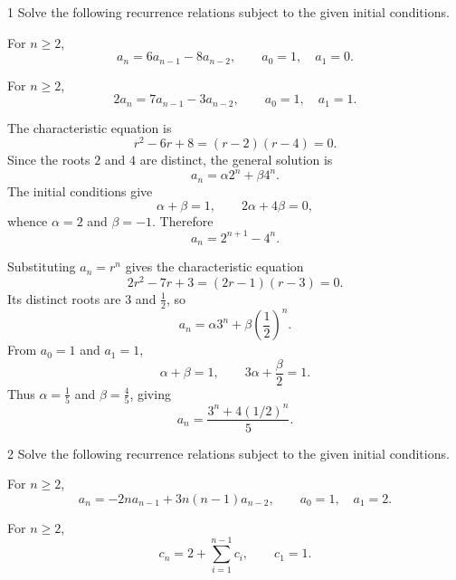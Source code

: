 \documentclass[11pt,oneside]{article}
\begin{document}

\begin{problem}{1}
Solve the following recurrence relations subject to the given initial conditions.
\begin{problemsubparts}
    \item For $n\geq2$,
    \[
        a_n=6a_{n-1}-8a_{n-2},
        \qquad a_0=1,\quad a_1=0.
    \]

    \item For $n\geq2$,
    \[
        2a_n=7a_{n-1}-3a_{n-2},
        \qquad a_0=1,\quad a_1=1.
    \]
\end{problemsubparts}
\end{problem}

\begin{solution}
\begin{problemsubparts}
    \item The characteristic equation is
    \[
        r^2-6r+8=(r-2)(r-4)=0.
    \]
    Since the roots $2$ and $4$ are distinct, the general solution is
    \[
        a_n=\alpha 2^n+\beta 4^n.
    \]
    The initial conditions give
    \[
        \alpha+\beta=1,\qquad 2\alpha+4\beta=0,
    \]
    whence $\alpha=2$ and $\beta=-1$. Therefore
    \[
        a_n=2^{n+1}-4^n.
    \]

    \item Substituting $a_n=r^n$ gives the characteristic equation
    \[
        2r^2-7r+3=(2r-1)(r-3)=0.
    \]
    Its distinct roots are $3$ and $\frac12$, so
    \[
        a_n=\alpha3^n+\beta\left(\frac12\right)^n.
    \]
    From $a_0=1$ and $a_1=1$,
    \[
        \alpha+\beta=1,\qquad 3\alpha+\frac{\beta}{2}=1.
    \]
    Thus $\alpha=\frac15$ and $\beta=\frac45$, giving
    \[
        a_n=\frac{3^n+4(1/2)^n}{5}.
    \]
\end{problemsubparts}
\end{solution}

\begin{problem}{2}
Solve the following recurrence relations subject to the given initial conditions.
\begin{problemsubparts}
    \item For $n\geq2$,
    \[
        a_n=-2na_{n-1}+3n(n-1)a_{n-2},
        \qquad a_0=1,\quad a_1=2.
    \]

    \item For $n\geq2$,
    \[
        c_n=2+\sum_{i=1}^{n-1}c_i,
        \qquad c_1=1.
    \]
\end{problemsubparts}
\end{problem}
\end{document}
